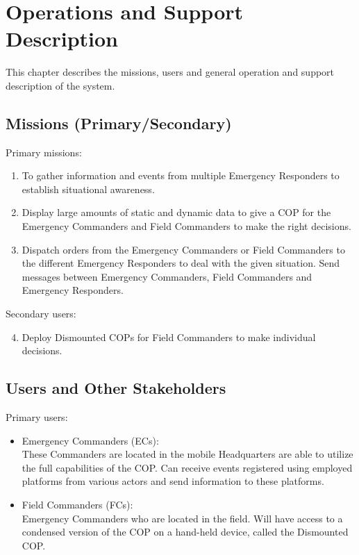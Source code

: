 \chapter{Operations and Support Description}
\label{chp_operations}
This chapter describes the missions, users and general operation and support description of the system.

\section{Missions (Primary/Secondary)}
Primary missions:
\begin{enumerate}
	\item To gather information and events from multiple Emergency Responders to establish situational awareness.
	\item Display large amounts of static and dynamic data to give a COP for the Emergency Commanders and Field Commanders to make the right decisions.
	\item Dispatch orders from the Emergency Commanders or Field Commanders to the different Emergency Responders to deal with the given situation. Send messages between Emergency Commanders, Field Commanders and Emergency Responders.
\end{enumerate}

\noindent Secondary users:
\begin{enumerate}
	\setcounter{enumi}{3}
	\item Deploy Dismounted COPs for Field Commanders to make individual decisions.
\end{enumerate}

\section{Users and Other Stakeholders}
\noindent Primary users:
\begin{itemize}
	\item Emergency Commanders (ECs): \\
	These Commanders are located in the mobile Headquarters are able to utilize the full capabilities of the COP. Can receive events registered using employed platforms from various actors and send information to these platforms.
	\item Field Commanders (FCs):\\
	Emergency Commanders who are located in the field. Will have access to a condensed version of the COP on a hand-held device, called the Dismounted COP.
\end{itemize}
	
